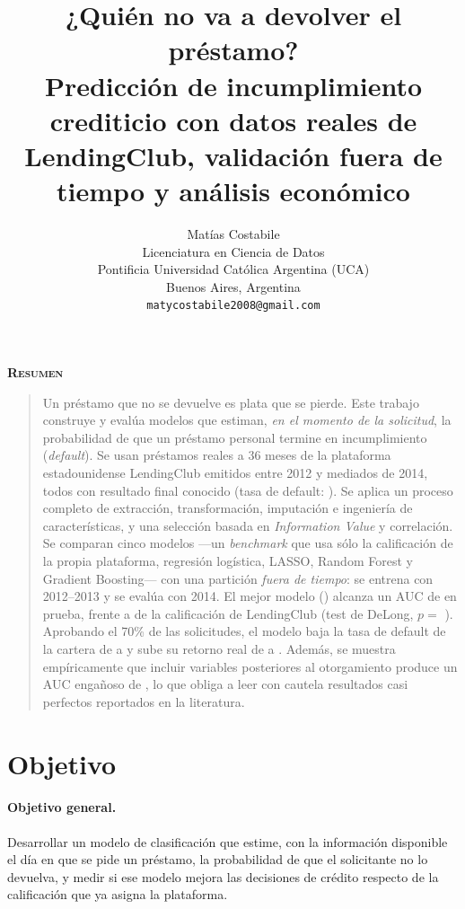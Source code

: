 \documentclass{article}
\title{¿Quién no va a devolver el préstamo?\\[0.3em]
\large Predicción de incumplimiento crediticio con datos reales de LendingClub,
validación fuera de tiempo y análisis económico}
\author{
  Matías Costabile \\
  Licenciatura en Ciencia de Datos\\
  Pontificia Universidad Católica Argentina (UCA)\\
  Buenos Aires, Argentina \\
  \texttt{matycostabile2008@gmail.com} \\
}
\renewenvironment{abstract}
  {\centerline{\large \bfseries \scshape Resumen}\begin{quote}}
  {\end{quote}}
\begin{document}
\maketitle

\begin{abstract}
Un préstamo que no se devuelve es plata que se pierde. Este trabajo construye y
evalúa modelos que estiman, \emph{en el momento de la solicitud}, la probabilidad
de que un préstamo personal termine en incumplimiento (\emph{default}). Se usan
\nTotal{} préstamos reales a 36 meses de la plataforma estadounidense LendingClub
emitidos entre 2012 y mediados de 2014, todos con resultado final conocido
(tasa de default: \tasaTotal). Se aplica un proceso completo de extracción,
transformación, imputación e ingeniería de características, y una selección
basada en \emph{Information Value} y correlación. Se comparan cinco modelos
---un \emph{benchmark} que usa sólo la calificación de la propia plataforma,
regresión logística, LASSO, Random Forest y Gradient Boosting--- con una
partición \emph{fuera de tiempo}: se entrena con 2012--2013 y se evalúa con
2014. El mejor modelo (\mejorModelo) alcanza un AUC de \aucMejor{} en prueba,
frente a \aucBench{} de la calificación de LendingClub (test de DeLong,
$p = $ \pDelongBench). Aprobando el 70\% de las solicitudes, el modelo baja la
tasa de default de la cartera de  a  y sube
su retorno real de \retBenchSetenta{} a \retMejorSetenta{}. Además, se muestra
empíricamente que incluir variables posteriores al otorgamiento produce un AUC
engañoso de \aucFuga, lo que obliga a leer con cautela resultados casi
perfectos reportados en la literatura.
\end{abstract}


\section{Objetivo}
\label{sec:objetivo}

\paragraph{Objetivo general.} Desarrollar un modelo de clasificación que estime,
con la información disponible el día en que se pide un préstamo, la probabilidad
de que el solicitante no lo devuelva, y medir si ese modelo mejora las decisiones
de crédito respecto de la calificación que ya asigna la plataforma.
\end{document}
